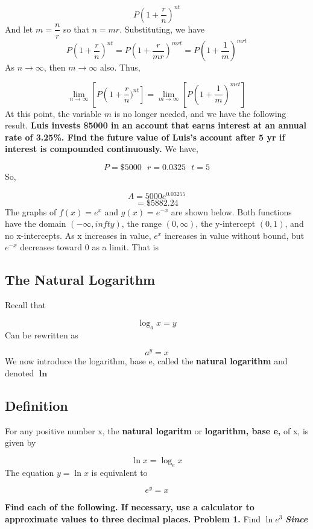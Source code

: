 \documentclass{report}
\begin{document}
$$ P \left(1+\dfrac{r}{n}\right)^{nt}$$
And let $m = \dfrac{n}{r}$ so that $ n = mr$. Substituting, we have
$$ P \left(1+\dfrac{r}{n}\right)^{nt} = P \left(1 + \dfrac{r}{mr}\right)^{mrt} = P \left(1 + \dfrac{1}{m}\right)^{mrt}$$
\bigbreak \noindent
As $n \to\infty$, then $m \to\infty$ also. Thus,

$$ \displaystyle\lim_{n\to\infty}\left[P\left(1+\dfrac{r}{n})^{nt}\right] = \displaystyle\lim_{m\to\infty}\left[P\left(1+\dfrac{1}{m}\right)^{mrt}\right]$$
\bigbreak \noindent
\noindent At this point, the variable $m$ is no longer needed, and we have the following result.
\bigbreak \noindent
{}
\q
\bigbreak \noindent
\textbf{Luis invests \$5000 in an account that earns interest at an annual rate of 3.25\%. Find the future value of Luis's account after 5 yr if interest is compounded continuously.}
\bigbreak \noindent
We have,

$$ P = \$5000 \ \ \ r = 0.0325 \ \ \ t = 5$$
So,

$$A = 5000e^{0.0325{5}}$$
$$ = \$ 5882.24$$
\bigbreak \noindent
The graphs of $f(x) = e^x$ and $g(x) = e^{-x}$ are shown below. Both functions have the domain $(-\infty, infty)$, the range $(0,\infty)$, the y-intercept $(0,1)$, and no x-intercepts. As x increases in value, $e^x$ increases in value without bound, but $e^{-x}$ decreases toward 0 as a limit. That is
\bigbreak
\hspace{-4mm}\begin{minipage}{0.46\textwidth}
    \centering
  \end{minipage}
  \begin{minipage}{0.5\textwidth}
  \end{minipage}
  \begin{mdframed}
\subsection*{The Natural Logarithm}
\bigbreak \noindent
Recall that 

$$ \log_{a}x = y$$
Can be rewritten as

$$ a^{y} = x$$
\bigbreak \noindent \bigbreak \noindent
We now introduce the logarithm, base e, called the \textbf{natural logarithm} and denoted $\mathbf{\ln}$
\bigbreak \noindent
\subsection*{Definition}
For any positive number x, the \textbf{natural logaritm} or \textbf{logarithm, base e,} of x, is given by

$$ \ln x = \log_{e}x$$
The equation $ y=\ln x$ is equivalent to 

$$e^y = x$$
\vspace{0.5mm}
\end{mdframed}
\bigbreak \noindent
\q
\bigbreak \noindent
\textbf{Find each of the following. If necessary, use a calculator to approximate values to three decimal places.}
\bigbreak \noindent
\textbf{Problem 1.} Find $\ln e^3$
\bigbreak \noindent
\textbf{\textit{Since}}
\end{document}
